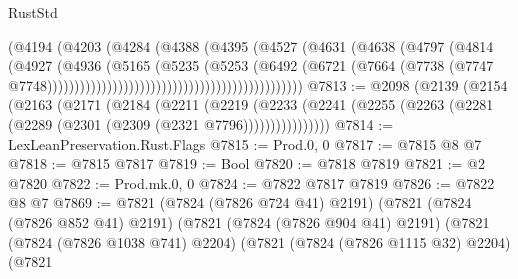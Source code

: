 \begin{lexlean}{RustStd}
\begin{coremodule}
                                                          (@4194
                                                            (@4203
                                                              (@4284
                                                                (@4388
                                                                  (@4395
                                                                    (@4527
                                                                      (@4631
                                                                        (@4638
                                                                          (@4797
                                                                            (@4814
                                                                              (@4927
                                                                                (@4936
                                                                                  (@5165
                                                                                    (@5235
                                                                                      (@5253
                                                                                        (@6492
                                                                                          (@6721
                                                                                            (@7664
                                                                                              (@7738
                                                                                                (@7747
                                                                                                  @7748)))))))))))))))))))))))))))))))))))))))))))))))
@7813 := @2098
    (@2139
      (@2154
        (@2163
          (@2171
            (@2184
              (@2211
                (@2219
                  (@2233
                    (@2241 (@2255 (@2263 (@2281 (@2289 (@2301 (@2309 (@2321 @7796))))))))))))))))
@7814 := LexLeanPreservation.Rust.Flags
@7815 := Prod.{0, 0}
@7817 := @7815 @8 @7
@7818 := @7815 @7817
@7819 := Bool
@7820 := @7818 @7819
@7821 := @2 @7820
@7822 := Prod.mk.{0, 0}
@7824 := @7822 @7817 @7819
@7826 := @7822 @8 @7
@7869 := @7821
    (@7824 (@7826 @724 @41) @2191)
    (@7821
      (@7824 (@7826 @852 @41) @2191)
      (@7821
        (@7824 (@7826 @904 @41) @2191)
        (@7821
          (@7824 (@7826 @1038 @741) @2204)
          (@7821
            (@7824 (@7826 @1115 @32) @2204)
            (@7821

\end{coremodule}
\end{lexlean}
